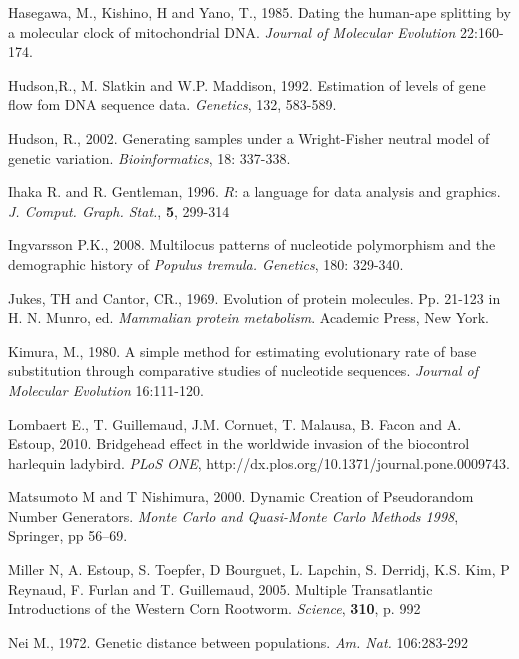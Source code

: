 \begin{thebibliography}{a}
 Hasegawa, M., Kishino,
H and Yano, T., 1985. Dating the human-ape splitting by a molecular
clock of mitochondrial DNA. \emph{Journal of Molecular Evolution}
22:160-174.

 Hudson,R., M. Slatkin
and W.P. Maddison, 1992. Estimation of levels of gene flow fom DNA
sequence data. \emph{Genetics}, 132, 583-589.

Hudson, R., 2002. Generating samples under a Wright-Fisher
neutral model of genetic variation. \emph{Bioinformatics}, 18: 337-338.

Ihaka R. and R. Gentleman,
1996. $R$: a language for data analysis and graphics. \emph{J. Comput.
Graph. Stat.}, \textbf{5}, 299-314

 Ingvarsson P.K., 2008. Multilocus
patterns of nucleotide polymorphism and the demographic history of
\emph{Populus tremula. Genetics}, 180: 329-340.

Jukes, TH and Cantor, CR.,
1969. Evolution of protein molecules. Pp. 21-123 in H. N. Munro, ed.
\emph{Mammalian protein metabolism}. Academic Press, New York.

Kimura, M., 1980. A simple method for
estimating evolutionary rate of base substitution through comparative
studies of nucleotide sequences. \emph{Journal of Molecular Evolution}
16:111-120.

Lombaert E., T. Guillemaud,
J.M. Cornuet, T. Malausa, B. Facon and A. Estoup, 2010. Bridgehead
effect in the worldwide invasion of the biocontrol harlequin ladybird.
\emph{PLoS ONE}, http://dx.plos.org/10.1371/journal.pone.0009743.

 Matsumoto M and T Nishimura,
2000. Dynamic Creation of Pseudorandom Number Generators. \emph{Monte
Carlo and Quasi-Monte Carlo Methods 1998}, Springer, pp 56--69.

 Miller N, A. Estoup,
S. Toepfer, D Bourguet, L. Lapchin, S. Derridj, K.S. Kim, P Reynaud,
F. Furlan and T. Guillemaud, 2005. Multiple Transatlantic Introductions
of the Western Corn Rootworm. \emph{Science}, \textbf{310}, p. 992

 Nei M., 1972. Genetic distance between
populations. \emph{Am. Nat.} 106:283-292


\end{thebibliography}
